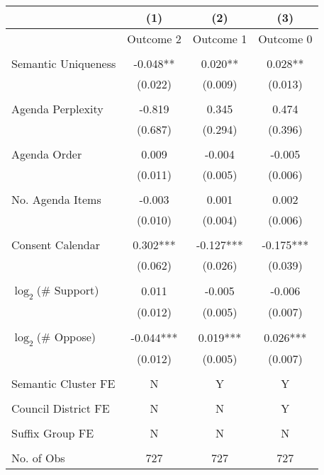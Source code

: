 \begin{tabular}{lccc}
\toprule
 & (1) & (2) & (3) \\
\midrule
 & Outcome 2 & Outcome 1 & Outcome 0 \\
 &  &  &  \\
Semantic Uniqueness & -0.048** & 0.020** & 0.028** \\
 & (0.022) & (0.009) & (0.013) \\
 &  &  &  \\
Agenda Perplexity & -0.819 & 0.345 & 0.474 \\
 & (0.687) & (0.294) & (0.396) \\
 &  &  &  \\
Agenda Order & 0.009 & -0.004 & -0.005 \\
 & (0.011) & (0.005) & (0.006) \\
 &  &  &  \\
No. Agenda Items & -0.003 & 0.001 & 0.002 \\
 & (0.010) & (0.004) & (0.006) \\
 &  &  &  \\
Consent Calendar & 0.302*** & -0.127*** & -0.175*** \\
 & (0.062) & (0.026) & (0.039) \\
 &  &  &  \\
$\log_2$(\# Support) & 0.011 & -0.005 & -0.006 \\
 & (0.012) & (0.005) & (0.007) \\
 &  &  &  \\
$\log_2$(\# Oppose) & -0.044*** & 0.019*** & 0.026*** \\
 & (0.012) & (0.005) & (0.007) \\
 &  &  &  \\
Semantic Cluster FE & N & Y & Y \\
 &  &  &  \\
Council District FE & N & N & Y \\
 &  &  &  \\
Suffix Group FE & N & N & N \\
 &  &  &  \\
No. of Obs & 727 & 727 & 727 \\
\bottomrule
\end{tabular}
